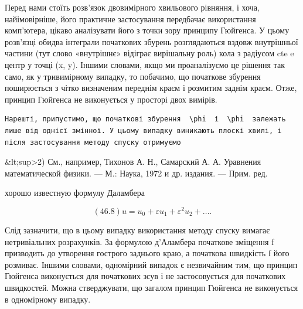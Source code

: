 \documentclass[
  ukrainian,
]{article}
\begin{document}
Перед нами стоїть розв'язок двовимірного хвильового рівняння, і хоча,
найімовірніше, його практичне застосування передбачає використання
комп'ютера, цікаво аналізувати його з точки зору принципу Гюйгенса. У
цьому розв'язці обидва інтеграли початкових збурень розглядаються вздовж
внутрішньої частини (тут слово «внутрішнє» відіграє вирішальну роль)
кола з радіусом cte e центр у точці (x, y). Іншими словами, якщо ми
проаналізуємо це рішення так само, як у тривимірному випадку, то
побачимо, що початкове збурення поширюється з чітко визначеним переднім
краєм і розмитим заднім краєм. Отже, принцип Гюйгенса не виконується у
просторі двох вимірів.

\begin{verbatim}
Нарешті, припустимо, що початкові збурення  \phi  і  \phi  залежать лише від однієї змінної. У цьому випадку виникають плоскі хвилі, і після застосування методу спуску отримуємо
\end{verbatim}

\&lt;sup\textgreater2) См., например, Тихонов А. Н., Самарский А. А.
Уравнения математической физики. --- М.: Наука, 1972 и др. издания. ---
Прим. ред.

хорошо известную формулу Даламбера

\[
(46.8) u = u_0 + \varepsilon u_1 + \varepsilon^2 u_2 + \dots.
\]

Слід зазначити, що в цьому випадку використання методу спуску вимагає
нетривіальних розрахунків. За формулою д'Аламбера початкове зміщення f
призводить до утворення гострого заднього краю, а початкова швидкість f
його розмиває. Іншими словами, одномірний випадок є незвичайним тим, що
принцип Гюйгенса виконується для початкових зсув і не застосовується для
початкових швидкостей. Можна стверджувати, що загалом принцип Гюйгенса
не виконується в одномірному випадку.
\end{document}
